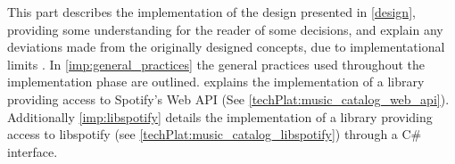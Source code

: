 This part describes the implementation of the design presented in \cref{design}, providing some understanding for the reader of some decisions, and explain any deviations made from the originally designed concepts, due to implementational limits . In \cref{imp:general_practices} the general practices used throughout the implementation phase are outlined.  explains the implementation of a library providing access to Spotify's Web API (See \cref{techPlat:music_catalog_web_api}). Additionally \cref{imp:libspotify} details the implementation of a library providing access to libspotify (see \cref{techPlat:music_catalog_libspotify}) through a C\# interface. 
